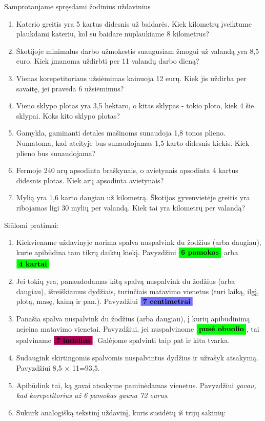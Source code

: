 \documentclass{article}
\begin{document}
\begin{mybox}{Samprotaujame spręsdami žodinius uždavinius}
{\begin{enumerate}
\item Katerio greitis yra 5 kartus didesnis už baidarės. Kiek kilometrų įveiktume plaukdami kateriu, kol su baidare nuplaukiame 8 kilometrus?
\item Škotijoje minimalus darbo užmokestis suaugusiam žmogui už valandą yra 8,5 euro. Kiek įmanoma uždirbti per 11 valandų darbo dieną?
\item Vienas korepetitoriaus užsiėmimas kainuoja 12 eurų. Kiek jis uždirba per savaitę, jei praveda 6 užsiėmimus?
\item Vieno sklypo plotas yra 3,5 hektaro, o kitas sklypas - tokio ploto, kiek 4 šie sklypai. Koks kito sklypo plotas?
\item Gamykla, gaminanti detales mašinoms sunaudoja 1,8 tonos plieno. Numatoma, kad ateityje bus sunaudojamas 1,5 karto didesnis kiekis. Kiek plieno bus sunaudojama?
\item Fermoje 240 arų apsodinta braškynais, o avietynais apsodinta 4 kartus didesnis plotas. Kiek arų apsodinta avietynais?
\item Mylią yra 1,6 karto daugiau už kilometrą. Škotijos gyvenvietėje greitis yra ribojamas ligi 30 mylių per valandą. Kiek tai yra kilometrų per valandą?
\end{enumerate}}
Siūlomi pratimai:
\begin{enumerate}
\item Kiekviename uždavinyje norima spalva nuspalvink du žodžius (arba daugiau), kurie apibūdina tam tikrų daiktų kiekį. Pavyzdžiui $\colorbox{green}{\textbf{6 pamokos}}$ arba $\colorbox{green}{\textbf{4 kartai}}$
\item Jei tokių yra, panaudodamas kitą spalvą nuspalvink du žodžius (arba daugiau), išreiškiamus dydžiais, turinčiais matavimo vienetus (turi laiką, ilgį, plotą, masę, kainą ir pan.). Pavyzdžiui $\colorbox{blue!55!white}{\textbf{7 centimetrai}}$
\item Panašia spalva nuspalvink du žodžius (arba daugiau), į kurių apibūdinimą neįeina matavimo vienetai. Pavyzdžiui, jei nuspalvinome $\colorbox{green}{\textbf{pusė obuolio}}$, tai spalviname $\colorbox{purple!90!blue}{\textbf{7 indelius}}$. Galėjome spalvinti taip pat ir kita tvarka.
\item Sudaugink skirtingomis spalvomis nuspalvintus dydžius ir užrašyk atsakymą. Pavyzdžiui 8,5 $\times$ 11=93,5.
\item Apibūdink tai, ką gavai atsakyme paminėdamas vienetus. Pavyzdžiui \textit{gavau, kad korepetitorius už 6 pamokas gauna 72 eurus}.
\item Sukurk analogišką tekstinį uždavinį, kuris susidėtų iš trijų sakinių:

\end{enumerate}
\end{mybox}
\end{document}
